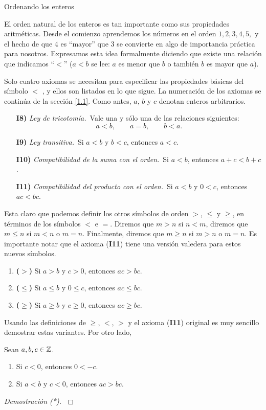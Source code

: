 \begin{section}{Ordenando los enteros}\label{1.2}

El orden natural de los enteros es tan importante como sus
propiedades aritméticas. Desde el comienzo aprendemos los números
en el orden $1, 2, 3, 4, 5,$ y el hecho de que $4$ es ``mayor'' que $3$ se
convierte en algo de importancia práctica para nosotros.
Expresamos esta idea formalmente diciendo que existe una relación
que indicamos ``$<$'' ($a < b$ se lee: $a$ es menor que
$b$ o también $b$ es mayor que $a$). 

Solo cuatro axiomas se necesitan para especificar las propiedades básicas del símbolo $<$ , y ellos son listados en lo que sigue. La numeración de los
axiomas se continúa de la sección \ref{1.1}. Como antes, $a$, $b$ y $c$ denotan enteros arbitrarios.

\begin{enumerate}
\item[{\bf I8)}] {\em Ley de tricotomía.}\, Vale una y sólo una de las relaciones
siguientes:
$$
a<b, \qquad a = b, \qquad b < a.
$$
\item[{\bf I9)}] {\em Ley transitiva.}\, Si $a< b$ y $b < c$, entonces $a<c$.
\item[{\bf I10)}] {\em Compatibilidad de la suma con el orden.}\, Si $a < b$, entonces $a+c < b+c$. 
\item[{\bf I11)}] {\em Compatibilidad del producto con el orden.}\, Si $a< b$ y $0< c$, entonces $ac < bc$. 
\end{enumerate}


Esta claro que podemos definir los otros símbolos de orden $>$,
$\le$ y $\ge$, en términos de los símbolos $<$ e $=$. Diremos que $m>n$ si  $n<m$, diremos que $m \le n$ si $m<n$ o $m=n$. Finalmente, diremos que $m \ge n$ si $m > n$ o $m=n$.  Es importante notar que el  axioma ({\bf I11}) tiene una versión valedera para estos nuevos símbolos.
\begin{enumerate}[label=(\alph*)]
\item {\bf ($>$)} Si $a > b$ y $c>0$, entonces $ac > bc$.
\item {\bf ($\le$)} Si $a \le b$ y $0 \le c$, entonces $ac \le bc$.
\item {\bf ($\ge$)} Si $a\ge b$ y $c\ge 0$, entonces $ac \ge bc$.
\end{enumerate}
Usando las definiciones de $\ge$, $<$, $>$ y el axioma ({\bf I11}) original es muy sencillo demostrar estas variantes. Por otro lado,

\begin{proposicion}\label{prop-compatibilidad-negativa}
	Sean $a, b, c \in {\mathbb Z}$.  
	\begin{enumerate}[label=(\alph*)]
		\item Si $c < 0$, entonces $0 < -c$.
		\item Si $a< b$ y $c< 0$, entonces $ac > bc$. 
	\end{enumerate}
\end{proposicion}
\begin{proof}[Demostración (*)] {${}^{}$}
	

\end{proof}
\end{section}

